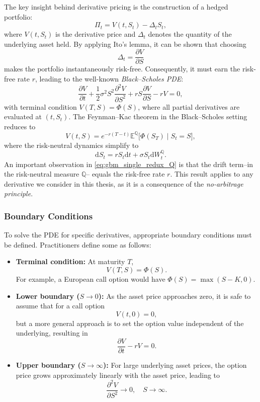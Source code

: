 \documentclass[12pt]{report} %
\theoremstyle{plain}           %
\theoremstyle{definition}      %
\theoremstyle{remark}          %
\begin{document}
The key insight behind derivative pricing is the construction of a hedged portfolio:
\[
\Pi_t = V(t,S_t) - \Delta_t S_t,
\]
where $V(t,S_t)$ is the derivative price and $\Delta_t$ denotes the quantity of the underlying asset held.
By applying Ito's lemma, it can be shown that choosing
\[
\Delta_t = \frac{\partial V}{\partial S}
\]
makes the portfolio instantaneously risk-free. Consequently, it must earn the risk-free rate $r$, leading to the
well-known \emph{Black--Scholes PDE}:
\begin{equation}\label{eq:BS_complete}
\frac{\partial V}{\partial t} + \frac{1}{2}\sigma^{2}S^{2}\frac{\partial^{2}V}{\partial S^{2}} + rS\frac{\partial V}{\partial S} - rV = 0,
\end{equation}
with terminal condition $V(T,S)=\Phi(S)$, where all partial derivatives are evaluated at $(t,S_t)$.  
The Feynman--Kac theorem in the Black--Scholes setting reduces to
\[
V(t,S) = e^{-r(T-t)}\mathbb{E}^{\mathbb{Q}}\bigl[\Phi(S_T)\mid S_t=S\bigr],
\]
where the risk-neutral dynamics simplify to
\begin{equation}\label{eq:gbm_single_redux_Q}
	\mathrm{d}S_t = r S_t\mathrm{d}t + \sigma S_t\mathrm{d}W^{\mathbb{Q}}_t.
\end{equation}
An important observation in \eqref{eq:gbm_single_redux_Q} is that the drift term--in the risk-neutral measure $\mathbb{Q}$--
equals the risk-free rate $r$. This result applies to any derivative
we consider in this thesis, as it is a consequence of the
\emph{no-arbitrage principle}.

\subsubsection{Boundary Conditions}

To solve the PDE for specific derivatives, appropriate boundary conditions must be defined. Practitioners
define some as follows:

\begin{itemize}
  \item \textbf{Terminal condition:} At maturity $T$,
  \[
  V(T,S)=\Phi(S).
  \]
  For example, a European call option would have $\Phi(S)=\max(S-K,0)$.

  \item \textbf{Lower boundary ($S\to 0$):} As the asset price approaches zero, it is safe to assume that for a call
  option
  \[
  V(t,0)=0,
  \]
  but a more general approach is to set the option value independent of the underlying, resulting in
  \[
  \frac{\partial V}{\partial t} - rV = 0.
  \]

  \item \textbf{Upper boundary ($S\to\infty$):} For large underlying asset prices, the option price grows
  approximately linearly with the asset price, leading to
  \[
  \frac{\partial^{2} V}{\partial S^{2}}\to 0,\quad S\to\infty.
  \]
\end{itemize}
\end{document}
